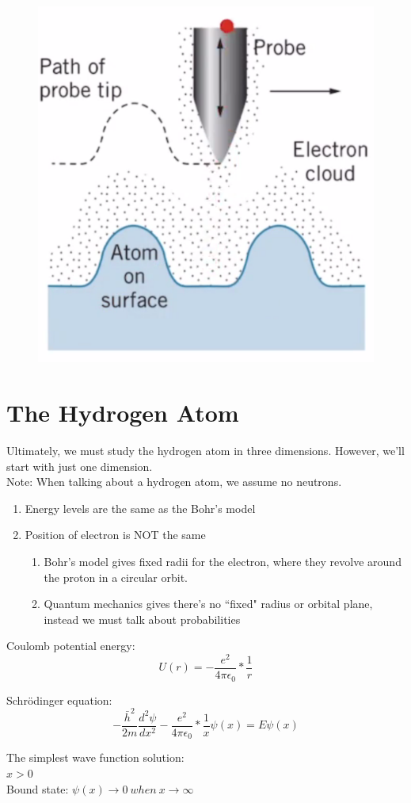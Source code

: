 \documentclass[class=article,crop=false]{standalone}
\begin{document}
\begin{figure}[h!]
	\centering
	\includegraphics[width=0.6\linewidth]{./Images/tunneling_microscope.png}
	\caption{}
\end{figure}

\section{The Hydrogen Atom}
Ultimately, we must study the hydrogen atom in three dimensions. However, we'll start with just one dimension. \\
Note: When talking about a hydrogen atom, we assume no neutrons. \\
\begin{enumerate}
	\item Energy levels are the same as the Bohr's model
	\item Position of electron is NOT the same
		\begin{enumerate}
			\item Bohr's model gives fixed radii for the electron, where they revolve around the proton in a circular orbit.
			\item Quantum mechanics gives there's no ``fixed" radius or orbital plane, instead we must talk about probabilities
		\end{enumerate}
\end{enumerate}

Coulomb potential energy:
$$U(r) = -\frac{e^2}{4\pi\epsilon_0} * \frac{1}{r} $$

Schrödinger equation:
$$ -\frac{\bar{h}^2}{2m} \frac{d^2\psi}{dx^2}  - \frac{e^2}{4\pi\epsilon_0} * \frac{1}{x} \psi(x) = E\psi(x) $$

\newpage
The simplest wave function solution: \\
$ x > 0 $ \\
Bound state: $ \psi(x) \rightarrow 0\ when\ x \rightarrow \infty $ \\
\end{document}
